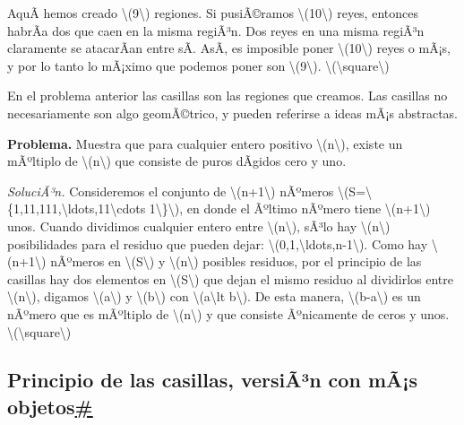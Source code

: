 \documentclass[
]{article}
\begin{document}
AquÃ­ hemos creado {\textbackslash(9\textbackslash)} regiones. Si
pusiÃ©ramos {\textbackslash(10\textbackslash)} reyes, entonces habrÃ­a
dos que caen en la misma regiÃ³n. Dos reyes en una misma regiÃ³n
claramente se atacarÃ­an entre sÃ­. AsÃ­, es imposible poner
{\textbackslash(10\textbackslash)} reyes o mÃ¡s, y por lo tanto lo
mÃ¡ximo que podemos poner son {\textbackslash(9\textbackslash)}.
{{\textbackslash(\textbackslash square\textbackslash)}}

En el problema anterior las casillas son las regiones que creamos. Las
casillas no necesariamente son algo geomÃ©trico, y pueden referirse a
ideas mÃ¡s abstractas.

\textbf{Problema.} Muestra que para cualquier entero positivo
{\textbackslash(n\textbackslash)}, existe un mÃºltiplo de
{\textbackslash(n\textbackslash)} que consiste de puros dÃ­gidos cero y
uno.

\emph{SoluciÃ³n.} Consideremos el conjunto de
{\textbackslash(n+1\textbackslash)} nÃºmeros
{\textbackslash(S=\textbackslash\{1,11,111,\textbackslash ldots,11\textbackslash cdots
1\textbackslash\}\textbackslash)}, en donde el Ãºltimo nÃºmero tiene
{\textbackslash(n+1\textbackslash)} unos. Cuando dividimos cualquier
entero entre {\textbackslash(n\textbackslash)}, sÃ³lo hay
{\textbackslash(n\textbackslash)} posibilidades para el residuo que
pueden dejar:
{\textbackslash(0,1,\textbackslash ldots,n-1\textbackslash)}. Como hay
{\textbackslash(n+1\textbackslash)} nÃºmeros en
{\textbackslash(S\textbackslash)} y {\textbackslash(n\textbackslash)}
posibles residuos, por el principio de las casillas hay dos elementos en
{\textbackslash(S\textbackslash)} que dejan el mismo residuo al
dividirlos entre {\textbackslash(n\textbackslash)}, digamos
{\textbackslash(a\textbackslash)} y {\textbackslash(b\textbackslash)}
con {\textbackslash(a\textbackslash lt b\textbackslash)}. De esta
manera, {\textbackslash(b-a\textbackslash)} es un nÃºmero que es
mÃºltiplo de {\textbackslash(n\textbackslash)} y que consiste
Ãºnicamente de ceros y unos.
{{\textbackslash(\textbackslash square\textbackslash)}}

\label{principio-de-las-casillas-version-con-mas-objetos}
\subsection{\texorpdfstring{Principio de las casillas, versiÃ³n con mÃ¡s
objetos\hyperref[principio-de-las-casillas-version-con-mas-objetos]{\#}}{Principio de las casillas, versiÃ³n con mÃ¡s objetos\#}}\label{principio-de-las-casillas-versiuxe3uxb3n-con-muxe3s-objetos}
\end{document}
